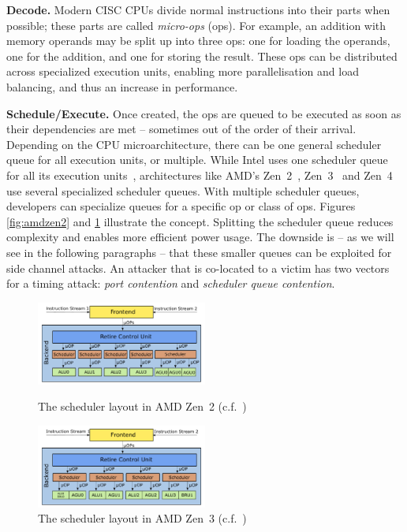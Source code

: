 \documentclass[11pt,
  titlepage=false,
]{scrreprt}
\begin{document}
\textbf{Decode.}
Modern CISC CPUs divide normal instructions into their parts when possible;
these parts are called \textit{micro-ops} (\textmu ops)\cite{AMD2020OptimizationEPYC7002}.
For example, an addition with memory operands may be split up into three \textmu ops: one for loading the operands, one for the addition, and one for storing the result.
These \textmu ops can be distributed across specialized execution units, enabling more parallelisation and load balancing, and thus an increase in performance.

\textbf{Schedule/Execute.}
Once created, the \textmu ops are queued to be executed as soon as their dependencies are met -- sometimes out of the order of their arrival.
Depending on the CPU microarchitecture, there can be one general scheduler queue for all execution units, or multiple.
While Intel uses one scheduler queue for all its execution units~\cite{Intel_opt},
architectures like AMD's Zen~2~\cite{AMD2020OptimizationEPYC7002}, Zen~3~\cite{AMD2020OptimizationEPYC7003} and Zen~4~\cite{AMDZen4} use several specialized scheduler queues.
With multiple scheduler queues, developers can specialize queues for a specific \textmu op or class of \textmu ops.
Figures \ref{fig:amdzen2} and \ref{fig:amdzen3} illustrate the concept.
Splitting the scheduler queue reduces complexity and enables more efficient power usage.
The downside is -- as we will see in the following paragraphs -- that these smaller queues can be exploited for side channel attacks.
An attacker that is co-located to a victim has two vectors for a timing attack: \textit{port contention} and \textit{scheduler queue contention}.

\begin{figure}
    \centering
    \includegraphics[width=0.5\textwidth]{figures/Zen2 arch}

    \caption{The scheduler layout in AMD Zen~2 (c.f.~\cite{AMD2020OptimizationEPYC7002})}
    \label{fig:amdzen2}

    \includegraphics[width=0.5\textwidth]{figures/Zen3 arch}

    \caption{The scheduler layout in AMD Zen~3 (c.f.~\cite{AMD2020OptimizationEPYC7003})}
    \label{fig:amdzen3}
\end{figure}
\end{document}
